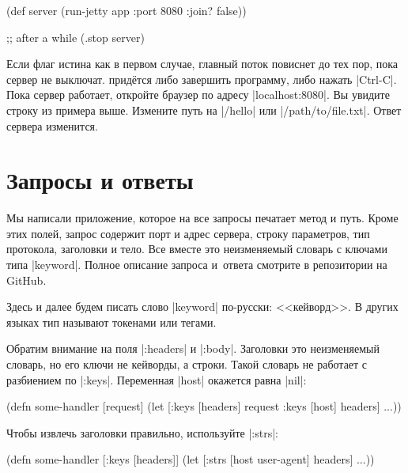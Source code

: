 \begin{english}
  \begin{clojure}
(def server
  (run-jetty app {:port 8080 :join? false}))

;; after a while
(.stop server)
  \end{clojure}
\end{english}

Если флаг истина как в первом случае, главный поток повиснет до тех пор, пока
сервер не выключат. прид\"{е}тся либо завершить программу, либо нажать
\spverb|Ctrl-C|. Пока сервер работает, откройте браузер по адресу
\spverb|localhost:8080|. Вы увидите строку из примера выше. Измените путь на
\spverb|/hello| или \spverb|/path/to/file.txt|. Ответ сервера изменится.

\section{Запросы и ответы}

Мы написали приложение, которое на все запросы печатает метод и путь. Кроме этих
полей, запрос содержит порт и адрес сервера, строку параметров, тип протокола,
заголовки и тело. Все вместе это неизменяемый словарь с ключами типа
\spverb|keyword|. Полное описание запроса и~ответа смотрите в репозитории на
GitHub.


Здесь и далее будем писать слово \spverb|keyword| по-русски: <<кейворд>>. В
других языках тип называют токенами или тегами.


Обратим внимание на поля \spverb|:headers| и \spverb|:body|. Заголовки это
неизменяемый словарь, но его ключи не кейворды, а строки. Такой словарь не
работает с разбиением по \spverb|:keys|. Переменная \spverb|host| окажется равна
\spverb|nil|:

\begin{english}
  \begin{clojure}
(defn some-handler
  [request]
  (let [{:keys [headers]} request
        {:keys [host]} headers]
    ...))
  \end{clojure}
\end{english}

Чтобы извлечь заголовки правильно, используйте \spverb|:strs|:

\begin{english}
  \begin{clojure}
(defn some-handler
  [{:keys [headers]}]
  (let [{:strs [host user-agent]} headers]
    ...))
  \end{clojure}
\end{english}

